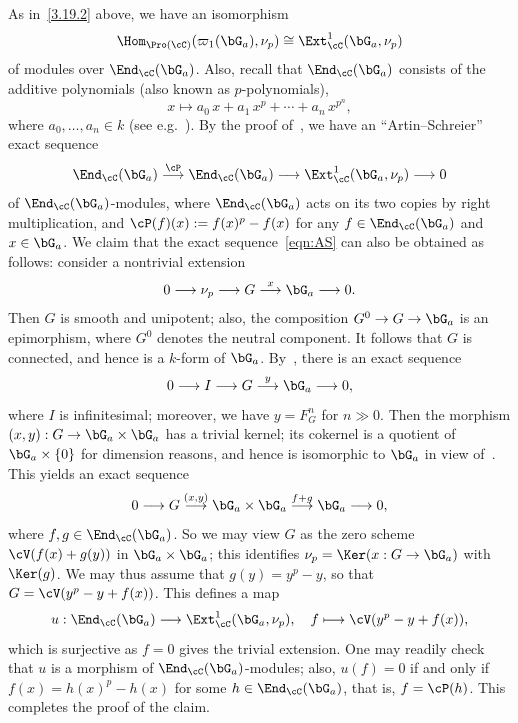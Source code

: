 \begin{rema}
As in~\ref{3.19.2} above, we have an isomorphism
\[
\Hom_{\Pro(\cC)}(\varpi_1(\bG_a), \nu_p)
\cong \Ext^1_{\cC}(\bG_a,\nu_p)
\]
of modules over $\End_{\cC}(\bG_a)$. Also, recall that $\End_{\cC}(\bG_a)$ consists of the additive polynomials (also known as $p$-polynomials),
\[
x \longmapsto a_0 \, x + a_1 \, x^p + \cdots + a_n \, x^{p^n},
\]
where $a_0, \ldots, a_n \in k$ (see e.g.~\cite[II.3.4.4]{DG}). By the proof of~\cite[Prop.~1.20]{Saito}, we have an ``Artin--Schreier'' exact sequence
\begin{equation}\label{eqn:AS}
\End_{\cC}(\bG_a) \stackrel{\cP}{\longrightarrow}
\End_{\cC}(\bG_a)
\longrightarrow \Ext^1_{\cC}(\bG_a,\nu_p)
\longrightarrow 0
\end{equation}
of $\End_{\cC}(\bG_a)$-modules, where $\End_{\cC}(\bG_a)$ acts on its two copies by right multiplication, and $\cP(f)(x) := f(x)^p - f(x)$ for any $f \in \End_{\cC}(\bG_a)$ and $x \in \bG_a$. We claim that the exact sequence~\eqref{eqn:AS} can also be obtained as follows: consider a nontrivial extension
\[
0 \longrightarrow \nu_p \longrightarrow G
\stackrel{x}{\longrightarrow} \bG_a \longrightarrow 0.
\]
Then $G$ is smooth and unipotent; also, the composition $G^0 \to G \to \bG_a$ is an epimorphism, where $G^0$ denotes the neutral component. It follows that $G$ is connected, and hence is a $k$-form of $\bG_a$. By~\cite[Lem.~1.3]{Russell}, there is an exact sequence
\[
0 \longrightarrow I \longrightarrow G
\stackrel{y}{\longrightarrow} \bG_a \longrightarrow 0,
\]
where $I$ is infinitesimal; moreover, we have $y = F^n_G$ for $n \gg 0$. Then the morphism $(x,y) : G \to \bG_a \times \bG_a$ has a trivial kernel; its cokernel is a quotient of $\bG_a \times \{ 0 \}$ for dimension reasons, and hence is isomorphic to $\bG_a$ in view of~\cite[IV.2.1.1]{DG}. This yields an exact sequence
\[
0 \longrightarrow G
\stackrel{(x,y)}{\longrightarrow} \bG_a \times \bG_a
\stackrel{f + g}{\longrightarrow} \bG_a
\longrightarrow 0,
\]
where $f, g \in \End_{\cC}(\bG_a)$. So we may view $G$ as the zero scheme $\cV(f(x) + g(y))$ in $\bG_a \times \bG_a$; this identifies $\nu_p = \Ker(x: G \to \bG_a)$ with $\Ker(g)$. We may thus assume that $g(y) = y^p - y$, so that $G = \cV(y^p - y + f(x))$. This defines a map
\[
u : \End_{\cC}(\bG_a) \longrightarrow
\Ext^1_{\cC}(\bG_a, \nu_p), \quad f \longmapsto \cV(y^p - y + f(x)),
\]
which is surjective as $f = 0$ gives the trivial extension. One may readily check that $u$ is a morphism of $\End_{\cC}(\bG_a)$-modules; also, $u(f) = 0$ if and only if $f(x) = h(x)^p - h(x)$ for some $h \in \End_{\cC}(\bG_a)$, that is, $f =\cP(h)$. This completes the proof of the claim.


\end{rema}
